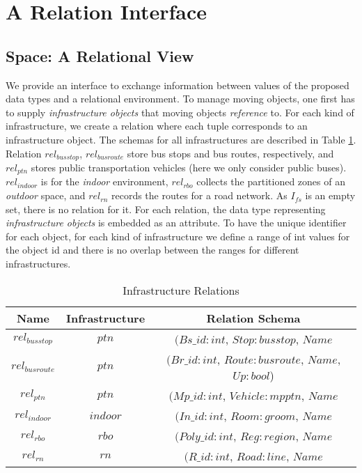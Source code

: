 \section{A Relation Interface}
\label{sec:relationinterface}
\subsection{Space: A Relational View}
\label{sec:spacerel}
We provide an interface to exchange information between values of the proposed data types and a relational environment. To manage moving objects,  one first has to supply  
\textit{infrastructure objects} that moving objects \textit{reference} to. For each kind of 
infrastructure, we create a relation where each tuple corresponds to an infrastructure object. The schemas for all infrastructures are described in Table \ref{tab:infrarel}.
Relation $rel_{busstop}$, $rel_{busroute}$ store bus stops and bus routes, respectively, and  $rel_{ptn}$ stores public transportation vehicles (here we only consider 
public buses). $rel_{indoor}$ is for the \textit{indoor} environment, 
$rel_{rbo}$ collects the partitioned zones of an \textit{outdoor} space, and 
$rel_{rn}$ records the routes for a road network. 
As $I_{fs}$ is an empty set, there is no relation for it. 
For each relation, the data type representing \textit{infrastructure objects} is embedded as 
an attribute. To have the unique identifier for each object, for each kind of infrastructure we define a range of int values for the object id and there is no overlap between the ranges for different infrastructures. \\ 

\begin{table}[ht]
 \begin{center} 
  \begin{tabular}{c|c|c}
	\hline
	 Name&Infrastructure&Relation Schema \\
	\hline
    $rel_{busstop}$ & $ptn$ & $(Bs\_id:int$, $Stop:busstop$, $Name$ \\
    \hline
    $rel_{busroute}$ & $ptn$ &$(Br\_id:int$, $Route:busroute$, $Name$, $Up:bool$) \\
    \hline 
	$rel_{ptn}$ & $ptn$ &$(Mp\_id:int$, $Vehicle:mpptn$, $Name$ \\
	\hline
	$rel_{indoor}$& $indoor$ &$(In\_id:int$, $Room:groom$, $Name$ \\
	\hline
	$rel_{rbo}$& $rbo$ &$(Poly\_id:int$, $Reg:region$, $Name$ \\
	\hline 
	$rel_{rn}$& $rn$ &$(R\_id:int$, $Road:line$, $Name$\\
	\hline 
  \end{tabular}
 \end{center}
 \caption{\label{tab:infrarel} Infrastructure Relations}
\end{table}


